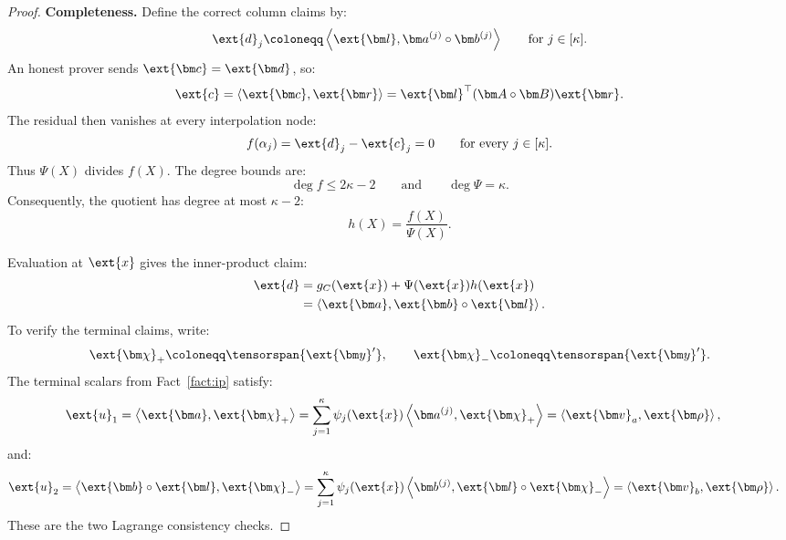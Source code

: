 \begin{proof}
\noindent\textbf{Completeness.}
Define the correct column claims by:
\[
    \ext{d}_j
    \coloneqq
    \left\langle
        \ext{\bm l},
        \bm a^{(j)}\circ\bm b^{(j)}
    \right\rangle
    \qquad
    \text{for }j\in[\kappa].
\]
An honest prover sends \(\ext{\bm c}=\ext{\bm d}\), so:
\[
    \ext{c}
    =
    \left\langle
        \ext{\bm c},\ext{\bm r}
    \right\rangle
    =
    \ext{\bm l}^{\top}
    (\bm A\circ\bm B)
    \ext{\bm r}.
\]
The residual then vanishes at every interpolation node:
\[
    f(\alpha_j)
    =
    \ext{d}_j-\ext{c}_j
    =
    0
    \qquad
    \text{for every }j\in[\kappa].
\]
Thus \(\Psi(X)\) divides \(f(X)\). The degree bounds are:
\[
    \deg f\leq2\kappa-2
    \qquad\text{and}\qquad
    \deg\Psi=\kappa.
\]
Consequently, the quotient has degree at most \(\kappa-2\):
\[
    h(X)=\frac{f(X)}{\Psi(X)}.
\]

Evaluation at \(\ext{x}\) gives the inner-product claim:
\[
\begin{aligned}
    \ext{d}
    &=
    g_C(\ext{x})
    +
    \Psi(\ext{x})h(\ext{x})\\
    &=
    \left\langle
        \ext{\bm a},
        \ext{\bm b}\circ\ext{\bm l}
    \right\rangle.
\end{aligned}
\]
To verify the terminal claims, write:
\[
    \ext{\bm\chi}_+
    \coloneqq
    \tensorspan{\ext{\bm y}'},
    \qquad
    \ext{\bm\chi}_-
    \coloneqq
    \tensorspan{\ext{\bm y}'}.
\]
The terminal scalars from Fact~\ref{fact:ip} satisfy:
\[
\begin{aligned}
    \ext{u}_1
    &=
    \left\langle
        \ext{\bm a},\ext{\bm\chi}_+
    \right\rangle=
    \sum_{j=1}^{\kappa}
    \psi_j(\ext{x})
    \left\langle
        \bm a^{(j)},\ext{\bm\chi}_+
    \right\rangle
    =
    \left\langle
        \ext{\bm v}_a,\ext{\bm\rho}
    \right\rangle,
\end{aligned}
\]
and:
\[
\begin{aligned}
    \ext{u}_2
    &=
    \left\langle
        \ext{\bm b}\circ\ext{\bm l},
        \ext{\bm\chi}_-
    \right\rangle
    =
    \sum_{j=1}^{\kappa}
    \psi_j(\ext{x})
    \left\langle
        \bm b^{(j)},
        \ext{\bm l}\circ\ext{\bm\chi}_-
    \right\rangle
    =
    \left\langle
        \ext{\bm v}_b,\ext{\bm\rho}
    \right\rangle.
\end{aligned}
\]
These are the two Lagrange consistency checks.


\end{proof}
